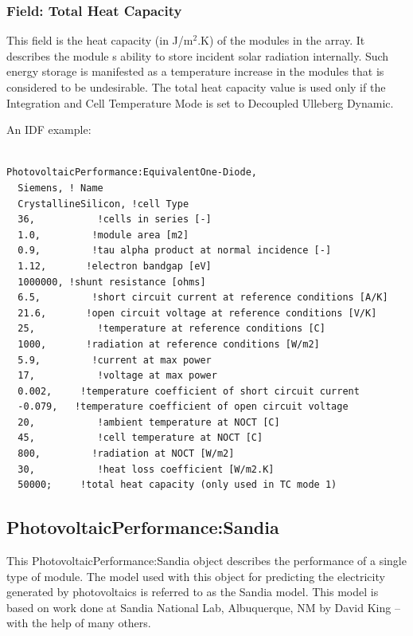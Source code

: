 \subsubsection{Field: Total Heat Capacity}\label{field-total-heat-capacity}

This field is the heat capacity (in J/m\(^{2}\).K) of the modules in the array. It describes the module s ability to store incident solar radiation internally. Such energy storage is manifested as a temperature increase in the modules that is considered to be undesirable. The total heat capacity value is used only if the Integration and Cell Temperature Mode is set to Decoupled Ulleberg Dynamic.

An IDF example:

\begin{lstlisting}

PhotovoltaicPerformance:EquivalentOne-Diode,
  Siemens, ! Name
  CrystallineSilicon, !cell Type
  36,           !cells in series [-]
  1.0,         !module area [m2]
  0.9,         !tau alpha product at normal incidence [-]
  1.12,       !electron bandgap [eV]
  1000000, !shunt resistance [ohms]
  6.5,         !short circuit current at reference conditions [A/K]
  21.6,       !open circuit voltage at reference conditions [V/K]
  25,           !temperature at reference conditions [C]
  1000,       !radiation at reference conditions [W/m2]
  5.9,         !current at max power
  17,           !voltage at max power
  0.002,     !temperature coefficient of short circuit current
  -0.079,   !temperature coefficient of open circuit voltage
  20,           !ambient temperature at NOCT [C]
  45,           !cell temperature at NOCT [C]
  800,         !radiation at NOCT [W/m2]
  30,           !heat loss coefficient [W/m2.K]
  50000;     !total heat capacity (only used in TC mode 1)
\end{lstlisting}

\subsection{PhotovoltaicPerformance:Sandia}\label{photovoltaicperformancesandia}

This PhotovoltaicPerformance:Sandia object describes the performance of a single type of module. The model used with this object for predicting the electricity generated by photovoltaics is referred to as the Sandia model. This model is based on work done at Sandia National Lab, Albuquerque, NM by David King -- with the help of many others.

